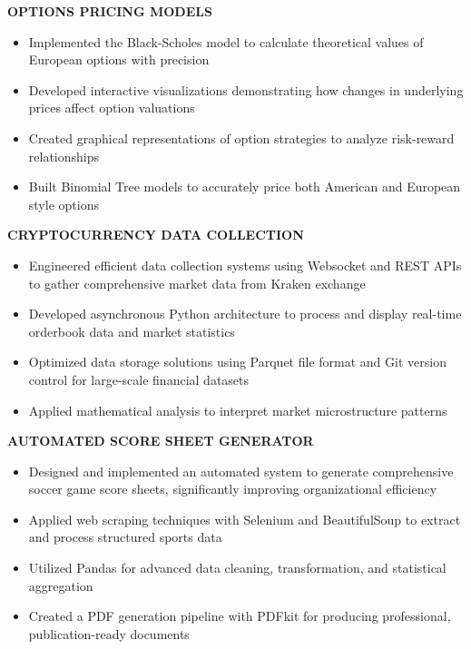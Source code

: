 \documentclass[11pt,letterpaper]{article}
\begin{document}
\begin{flushleft}
\textbf{\color{subheadingcolor}OPTIONS PRICING MODELS}
\begin{itemize}[leftmargin=*,nosep]
    \item Implemented the Black-Scholes model to calculate theoretical values of European options with precision
    \item Developed interactive visualizations demonstrating how changes in underlying prices affect option valuations
    \item Created graphical representations of option strategies to analyze risk-reward relationships
    \item Built Binomial Tree models to accurately price both American and European style options
\end{itemize}
\end{flushleft}

\begin{flushleft}
\textbf{\color{subheadingcolor}CRYPTOCURRENCY DATA COLLECTION}
\begin{itemize}[leftmargin=*,nosep]
    \item Engineered efficient data collection systems using Websocket and REST APIs to gather comprehensive market data from Kraken exchange
    \item Developed asynchronous Python architecture to process and display real-time orderbook data and market statistics
    \item Optimized data storage solutions using Parquet file format and Git version control for large-scale financial datasets
    \item Applied mathematical analysis to interpret market microstructure patterns
\end{itemize}
\end{flushleft}

\begin{flushleft}
\textbf{\color{subheadingcolor}AUTOMATED SCORE SHEET GENERATOR}
\begin{itemize}[leftmargin=*,nosep]
    \item Designed and implemented an automated system to generate comprehensive soccer game score sheets, significantly improving organizational efficiency
    \item Applied web scraping techniques with Selenium and BeautifulSoup to extract and process structured sports data
    \item Utilized Pandas for advanced data cleaning, transformation, and statistical aggregation
    \item Created a PDF generation pipeline with PDFkit for producing professional, publication-ready documents
\end{itemize}
\end{flushleft}
\end{document}

